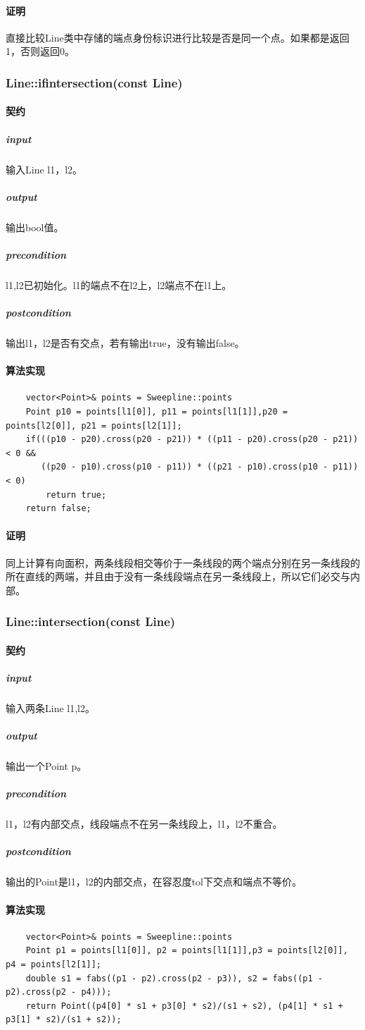 \documentclass[a4paper]{book}
\numberwithin{equation}{chapter}
\theoremstyle{definition}
\begin{document}
	
\paragraph{证明}
直接比较Line类中存储的端点身份标识进行比较是否是同一个点。如果都是返回1，否则返回0。

\subsubsection{Line::ifintersection(const Line)}
\paragraph{契约}
\subparagraph{input}
输入Line l1，l2。
\subparagraph{output}
输出bool值。
\subparagraph{precondition}
l1,l2已初始化。l1的端点不在l2上，l2端点不在l1上。
\subparagraph{postcondition}
输出l1，l2是否有交点，若有输出true，没有输出false。
\paragraph{算法实现}
\begin{lstlisting}
	vector<Point>& points = Sweepline::points
	Point p10 = points[l1[0]], p11 = points[l1[1]],p20 = points[l2[0]], p21 = points[l2[1]];
	if(((p10 - p20).cross(p20 - p21)) * ((p11 - p20).cross(p20 - p21)) < 0 &&
	   ((p20 - p10).cross(p10 - p11)) * ((p21 - p10).cross(p10 - p11)) < 0)
		return true;
	return false;  
\end{lstlisting}
\paragraph{证明}
同上计算有向面积，两条线段相交等价于一条线段的两个端点分别在另一条线段的所在直线的两端，并且由于没有一条线段端点在另一条线段上，所以它们必交与内部。
\subsubsection{Line::intersection(const Line)}
\paragraph{契约}
\subparagraph{input}
输入两条Line l1,l2。
\subparagraph{output}
输出一个Point p。
\subparagraph{precondition}
l1，l2有内部交点，线段端点不在另一条线段上，l1，l2不重合。
\subparagraph{postcondition}
输出的Point是l1，l2的内部交点，在容忍度tol下交点和端点不等价。
\paragraph{算法实现}
\begin{lstlisting}
	vector<Point>& points = Sweepline::points
	Point p1 = points[l1[0]], p2 = points[l1[1]],p3 = points[l2[0]], p4 = points[l2[1]];
	double s1 = fabs((p1 - p2).cross(p2 - p3)), s2 = fabs((p1 - p2).cross(p2 - p4)));
	return Point((p4[0] * s1 + p3[0] * s2)/(s1 + s2), (p4[1] * s1 + p3[1] * s2)/(s1 + s2));
\end{lstlisting}
\end{document}
